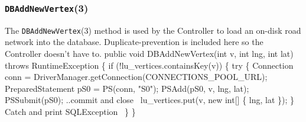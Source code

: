 \documentclass{article}
\def\nwendcode{\endtrivlist \endgroup}      %
\let\nwdocspar=\par
\theoremstyle{definition}                   %
\begin{document}
\subsubsection{{\tt{}\protect{}DBAddNewVertex}(3)}
The {\tt{}\protect{}DBAddNewVertex}(3) method is used by the Controller to load an on-disk
road network into the database. Duplicate-prevention is included here so the
Controller doesn't have to.
\nwenddocs{}\endmoddef{}
public void DBAddNewVertex(int v, int lng, int lat) throws RuntimeException \{
  if (!lu_vertices.containsKey(v)) \{
    try \{
      Connection conn = DriverManager.getConnection(CONNECTIONS_POOL_URL);
      PreparedStatement pS0 = PS(conn, "S0");
      PSAdd(pS0, v, lng, lat);
      PSSubmit(pS0);
      \LA{}..commit and close~{\nwtagstyle{}}\RA{}
      lu_vertices.put(v, new int[] \{ lng, lat \});
    \}
    \LA{}Catch and print \code{}SQLException\edoc{}~{\nwtagstyle{}}\RA{}
  \}
\}
\eatline
{}\nwendcode{}\nwdocspar
\end{document}

